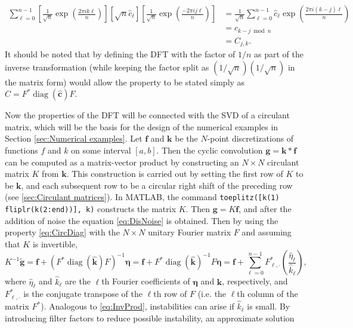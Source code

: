 \documentclass[12pt]{article}
\newcommand{\gVec}{\mathbf{g}}	%
\newcommand{\gnoiseVec}{\widetilde{\mathbf{g}}}	%
\newcommand{\kVec}{\mathbf{k}}	%
\newcommand{\kMat}{K}	%
\newcommand{\fVec}{\mathbf{f}}	%
\newcommand{\ctrans}{*}	%
\newcommand{\diag}{\operatorname{diag}}	%
\newcommand{\noise}{\eta}	%
\newcommand{\noiseVec}{\bm{\noise}}	%
\begin{document}
\begin{align*}
\sum_{\ell=0}^{n-1} \left[\frac{1}{\sqrt{n}}  \exp\left(\frac{2\pi{i}k\ell}{n}\right)\right] \left[\sqrt{n}\widehat{c}_\ell\right] \left[\frac{1}{\sqrt{n}} \exp\left(\frac{-2\pi{i}j\ell}{n}\right)\right] &= \frac{1}{\sqrt{n}} \sum_{\ell=0}^{n-1} \widehat{c}_\ell \exp\left(\frac{2\pi{i}(k-j)\ell}{n}\right) \\
&= c_{k-j \bmod n} \\
&= C_{j,k}.
\end{align*}
It should be noted that by defining the DFT with the factor of $1/n$ as part of the inverse transformation (while keeping the factor split as $(1/\sqrt{n})(1/\sqrt{n})$ in the matrix form) would allow the property to be stated simply as $C = F^\ctrans\diag(\widehat{\mathbf{c}})F$. \par 
Now the properties of the DFT will be connected with the SVD of a circulant matrix, which will be the basis for the design of the numerical examples in Section \ref{sec:Numerical examples}. Let $\fVec$ and $\kVec$ be the $N$-point discretizations of functions $f$ and $k$ on some interval $[a,b]$. Then the cyclic convolution $\gVec = \kVec * \fVec$ can be computed as a matrix-vector product by constructing an $N \times N$ circulant matrix $\kMat$ from $\kVec$. This construction is carried out by setting the first row of $\kMat$ to be $\kVec$, and each subsequent row to be a circular right shift of the preceding row (see \ref{sec:Circulant matrices}). In MATLAB, the command \texttt{toeplitz([k(1) fliplr(k(2:end))], k)} constructs the matrix $\kMat$. Then $\gVec = \kMat\fVec$, and after the addition of noise the equation \eqref{eq:DisNoise} is obtained. Then by using the property \eqref{eq:CircDiag} with the $N \times N$ unitary Fourier matrix $F$ and assuming that $\kMat$ is invertible, 
\begin{equation}
\kMat^{-1}\gnoiseVec = \fVec + (F^\ctrans\diag(\widehat{\kVec})F)^{-1}\noiseVec = \fVec + F^\ctrans\diag(\widehat{\kVec})^{-1}F\noiseVec = \fVec + \sum_{\ell = 0}^{n-1} F^\ctrans_{\ell,\cdot}\left(\frac{\widehat{\noise}_\ell}{\widehat{k}_\ell}\right),
\label{eq:InvProdDFT}
\end{equation}
where $\widehat{\noise}_\ell$ and $\widehat{k}_\ell$ are the $\ell$th Fourier coefficients of $\noiseVec$ and $\kVec$, respectively, and $F^\ctrans_{\ell,\cdot}$ is the conjugate transpose of the $\ell$th row of $F$ (i.e. the $\ell$th column of the matrix $F^\ctrans$). Analogous to \eqref{eq:InvProd}, instabilities can arise if $\widehat{k}_\ell$ is small. By introducing filter factors to reduce possible instability, an approximate solution
\end{document}
